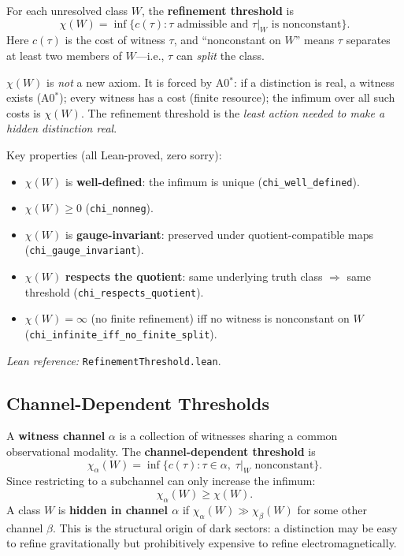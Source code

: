 For each unresolved class $W$, the \textbf{refinement threshold} is
\begin{equation}
\label{eq:chi}
\boxed{
\chi(W) = \inf\bigl\{c(\tau) : \tau \text{ admissible and } \tau|_W \text{ is nonconstant}\bigr\}.
}
\end{equation}
Here $c(\tau)$ is the cost of witness $\tau$, and ``nonconstant on $W$'' means $\tau$ separates at least two members of $W$---i.e., $\tau$ can \emph{split} the class.

$\chi(W)$ is \emph{not} a new axiom.  It is forced by A0$^*$: if a distinction is real, a witness exists (A0$^*$); every witness has a cost (finite resource); the infimum over all such costs is $\chi(W)$.  The refinement threshold is the \emph{least action needed to make a hidden distinction real}.

Key properties (all Lean-proved, zero sorry):
\begin{itemize}
\item $\chi(W)$ is \textbf{well-defined}: the infimum is unique (\texttt{chi\_well\_defined}).
\item $\chi(W) \geq 0$ (\texttt{chi\_nonneg}).
\item $\chi(W)$ is \textbf{gauge-invariant}: preserved under quotient-compatible maps (\texttt{chi\_gauge\_invariant}).
\item $\chi(W)$ \textbf{respects the quotient}: same underlying truth class $\Rightarrow$ same threshold (\texttt{chi\_respects\_quotient}).
\item $\chi(W) = \infty$ (no finite refinement) iff no witness is nonconstant on $W$ (\texttt{chi\_infinite\_iff\_no\_finite\_split}).
\end{itemize}

\emph{Lean reference:} \texttt{RefinementThreshold.lean}.

\subsection{Channel-Dependent Thresholds}
\label{sec:manifestability:channels}

A \textbf{witness channel} $\alpha$ is a collection of witnesses sharing a common observational modality.  The \textbf{channel-dependent threshold} is
\[
\chi_\alpha(W) = \inf\bigl\{c(\tau) : \tau \in \alpha,\; \tau|_W \text{ nonconstant}\bigr\}.
\]
Since restricting to a subchannel can only increase the infimum:
\[
\chi_\alpha(W) \geq \chi(W).
\]
A class $W$ is \textbf{hidden in channel $\alpha$} if $\chi_\alpha(W) \gg \chi_\beta(W)$ for some other channel $\beta$.  This is the structural origin of dark sectors: a distinction may be easy to refine gravitationally but prohibitively expensive to refine electromagnetically.

